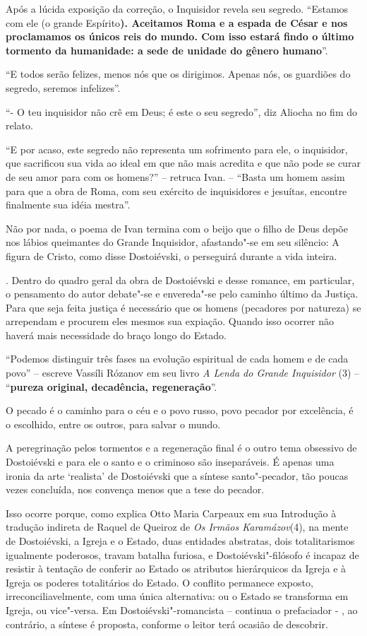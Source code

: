 Após a lúcida exposição da correção, o Inquisidor revela seu segredo.
``Estamos com ele (o grande Espírito\textbf{). Aceitamos Roma e a espada
de César e nos proclamamos os únicos reis do mundo. Com isso estará
findo o último tormento da humanidade: a sede de unidade do gênero
humano}''.

``E todos serão felizes, menos nós que os dirigimos. Apenas nós, os
guardiões do segredo, seremos infelizes''.

``- O teu inquisidor não crê em Deus; é este o seu segredo'', diz
Aliocha no fim do relato.

``E por acaso, este segredo não representa um sofrimento para ele, o
inquisidor, que sacrificou sua vida ao ideal em que não mais acredita e
que não pode se curar de seu amor para com os homens?'' -- retruca Ivan.
-- ``Basta um homem assim para que a obra de Roma, com seu exército de
inquisidores e jesuítas, encontre finalmente sua idéia mestra''.

Não por nada, o poema de Ivan termina com o beijo que o filho de Deus
depõe nos lábios queimantes do Grande Inquisidor, afastando"-se em seu
silêncio: A figura de Cristo, como disse Dostoiévski, o perseguirá
durante a vida inteira.

. Dentro do quadro geral da obra de Dostoiévski e desse romance, em
particular, o pensamento do autor debate"-se e envereda"-se pelo caminho
último da Justiça. Para que seja feita justiça é necessário que os
homens (pecadores por natureza) se arrependam e procurem eles mesmos sua
expiação. Quando isso ocorrer não haverá mais necessidade do braço longo
do Estado.

``Podemos distinguir três fases na evolução espiritual de cada homem e
de cada povo'' -- escreve Vassíli Rózanov em seu livro \emph{A Lenda do
Grande Inquisidor} (3) -- ``\textbf{pureza original, decadência,
regeneração}''.

O pecado é o caminho para o céu e o povo russo, povo pecador por
excelência, é o escolhido, entre os outros, para salvar o mundo.

A peregrinação pelos tormentos e a regeneração final é o outro tema
obsessivo de Dostoiévski e para ele o santo e o criminoso são
inseparáveis. É apenas uma ironia da arte `realista' de Dostoiévski que
a síntese santo"-pecador, tão poucas vezes concluída, nos convença menos
que a tese do pecador.

Isso ocorre porque, como explica Otto Maria Carpeaux em sua Introdução à
tradução indireta de Raquel de Queiroz de \emph{Os Irmãos Karamázov}(4),
na mente de Dostoiévski, a Igreja e o Estado, duas entidades abstratas,
dois totalitarismos igualmente poderosos, travam batalha furiosa, e
Dostoiévski"-filósofo é incapaz de resistir à tentação de conferir ao
Estado os atributos hierárquicos da Igreja e à Igreja os poderes
totalitários do Estado. O conflito permanece exposto,
irreconciliavelmente, com uma única alternativa: ou o Estado se
transforma em Igreja, ou vice"-versa. Em Dostoiévski"-romancista --
continua o prefaciador - , ao contrário, a síntese é proposta, conforme
o leitor terá ocasião de descobrir.

